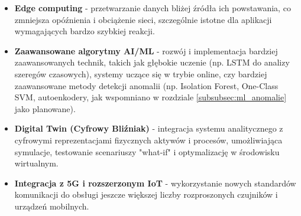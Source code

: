 \begin{itemize}
    \item \textbf{Edge computing} - przetwarzanie danych bliżej źródła ich powstawania, co zmniejsza opóźnienia i obciążenie sieci, szczególnie istotne dla aplikacji wymagających bardzo szybkiej reakcji.
    \item \textbf{Zaawansowane algorytmy AI/ML} - rozwój i implementacja bardziej zaawansowanych technik, takich jak głębokie uczenie (np. LSTM do analizy szeregów czasowych), systemy uczące się w trybie online, czy bardziej zaawansowane metody detekcji anomalii (np. Isolation Forest, One-Class SVM, autoenkodery, jak wspomniano w rozdziale \ref{subsubsec:ml_anomalie} jako planowane).
    \item \textbf{Digital Twin (Cyfrowy Bliźniak)} - integracja systemu analitycznego z cyfrowymi reprezentacjami fizycznych aktywów i procesów, umożliwiająca symulacje, testowanie scenariuszy "what-if" i optymalizację w środowisku wirtualnym.
    \item \textbf{Integracja z 5G i rozszerzonym IoT} - wykorzystanie nowych standardów komunikacji do obsługi jeszcze większej liczby rozproszonych czujników i urządzeń mobilnych.
\end{itemize}